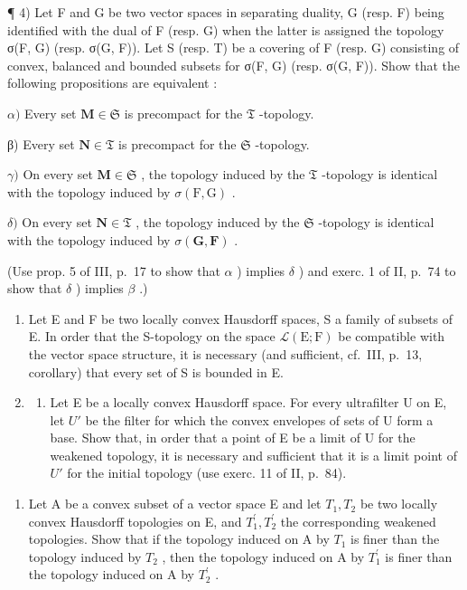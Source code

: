 ¶ 4) Let F and G be two vector spaces in separating duality, G (resp. F) being identified with the dual of F (resp. G) when the latter is assigned the topology σ(F, G) (resp. σ(G, F)). Let S (resp. T) be a covering of F (resp. G) consisting of convex, balanced and bounded subsets for σ(F, G) (resp. σ(G, F)). Show that the following propositions are equivalent :

\(\alpha)\) Every set \(\mathbf{M} \in \mathfrak{S}\) is precompact for the \(\mathfrak{T}\) -topology.

β) Every set \(\mathbf{N} \in \mathfrak{T}\) is precompact for the \(\mathfrak{S}\) -topology.

\(\gamma)\) On every set \(\mathbf{M} \in \mathfrak{S}\) , the topology induced by the \(\mathfrak{T}\) -topology is identical with the topology induced by \(\sigma(\mathrm{F}, \mathrm{G})\) .

\(\delta)\) On every set \(\mathbf{N} \in \mathfrak{T}\) , the topology induced by the \(\mathfrak{S}\) -topology is identical with the topology induced by \(\sigma(\mathbf{G}, \mathbf{F})\) .

(Use prop. 5 of III, p.~17 to show that \(\alpha\) ) implies \(\delta\) ) and exerc. 1 of II, p.~74 to show that \(\delta\) ) implies \(\beta\) .)

\begin{enumerate}
\def\labelenumi{\arabic{enumi})}
\setcounter{enumi}{4}
\item
  Let E and F be two locally convex Hausdorff spaces, S a family of subsets of E. In order that the S-topology on the space \(\mathcal{L}(\mathrm{E};\mathrm{F})\) be compatible with the vector space structure, it is necessary (and sufficient, cf.~III, p.~13, corollary) that every set of S is bounded in E.
\item
  \begin{enumerate}
  \def\labelenumii{\alph{enumii})}
  \tightlist
  \item
    Let E be a locally convex Hausdorff space. For every ultrafilter U on E, let \(U'\) be the filter for which the convex envelopes of sets of U form a base. Show that, in order that a point of E be a limit of U for the weakened topology, it is necessary and sufficient that it is a limit point of \(U'\) for the initial topology (use exerc. 11 of II, p.~84).
  \end{enumerate}
\end{enumerate}

\begin{enumerate}
\def\labelenumi{\alph{enumi})}
\setcounter{enumi}{1}
\tightlist
\item
  Let A be a convex subset of a vector space E and let \(T_{1}, T_{2}\) be two locally convex Hausdorff topologies on E, and \(T_{1}^{\prime}, T_{2}^{\prime}\) the corresponding weakened topologies. Show that if the topology induced on A by \(T_{1}\) is finer than the topology induced by \(T_{2}\) , then the topology induced on A by \(T_{1}^{\prime}\) is finer than the topology induced on A by \(T_{2}^{\prime}\) .
\end{enumerate}

